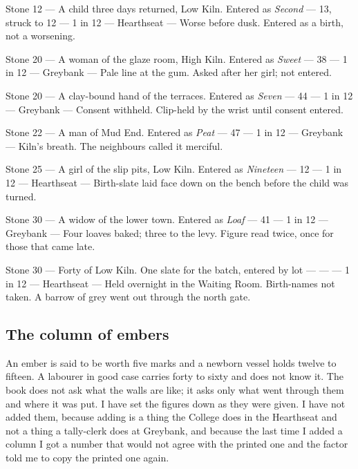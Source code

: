 \documentclass{design/chronicle}
\begin{document}
Stone 12 — A child three days returned, Low Kiln. Entered as \emph{Second} — 13, struck to 12 — 1 in 12 — Hearthseat — Worse before dusk. Entered as a birth, not a worsening.\par

Stone 20 — A woman of the glaze room, High Kiln. Entered as \emph{Sweet} — 38 — 1 in 12 — Greybank — Pale line at the gum. Asked after her girl; not entered.\par

Stone 20 — A clay-bound hand of the terraces. Entered as \emph{Seven} — 44 — 1 in 12 — Greybank — Consent withheld. Clip-held by the wrist until consent entered.\par

Stone 22 — A man of Mud End. Entered as \emph{Peat} — 47 — 1 in 12 — Greybank — Kiln’s breath. The neighbours called it merciful.\par

Stone 25 — A girl of the slip pits, Low Kiln. Entered as \emph{Nineteen} — 12 — 1 in 12 — Hearthseat — Birth-slate laid face down on the bench before the child was turned.\par

Stone 30 — A widow of the lower town. Entered as \emph{Loaf} — 41 — 1 in 12 — Greybank — Four loaves baked; three to the levy. Figure read twice, once for those that came late.\par

Stone 30 — Forty of Low Kiln. One slate for the batch, entered by lot — — — 1 in 12 — Hearthseat — Held overnight in the Waiting Room. Birth-names not taken. A barrow of grey went out through the north gate.\par

\subsection*{The column of embers}

An ember is said to be worth five marks and a newborn vessel holds twelve to fifteen. A labourer in good case carries forty to sixty and does not know it. The book does not ask what the walls are like; it asks only what went through them and where it was put. I have set the figures down as they were given. I have not added them, because adding is a thing the College does in the Hearthseat and not a thing a tally-clerk does at Greybank, and because the last time I added a column I got a number that would not agree with the printed one and the factor told me to copy the printed one again.
\end{document}

